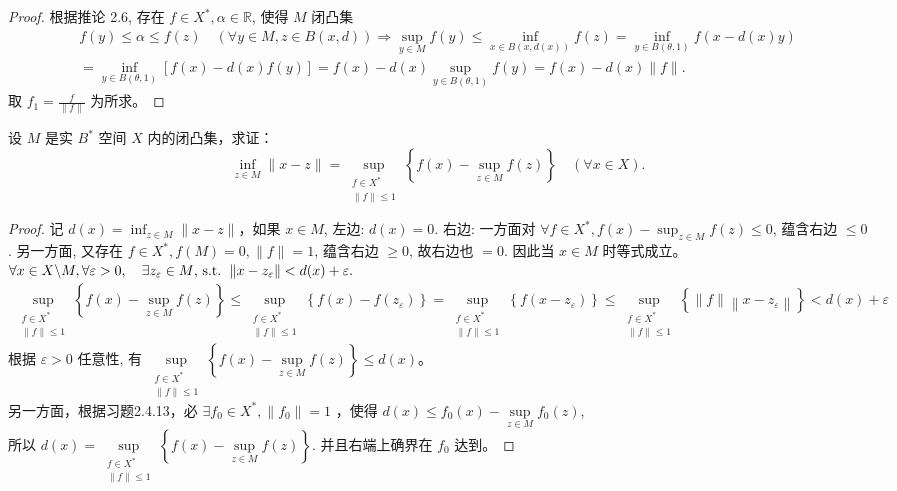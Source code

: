 \documentclass[lang=cn,newtx,10pt,scheme=chinese,thmcnt=chapter]{elegantbook}
\begin{document}
\begin{proof}
根据推论 2.6, 存在 $f \in {X} ^*, \alpha \in \mathbb{R} $, 使得 $M$ 闭凸集
\begin{equation*}
\begin{aligned}
 f(y) \leqslant \alpha \leqslant f(z) \quad(\forall y \in M, z \in B(x, d))
 \Rightarrow \sup _{y \in M} f(y) \leqslant \inf _{x \in B(x, d(x))} f(z)=\inf _{y \in B(\theta, 1)} f(x-d(x) y)  \\ =\inf_{y \in B(\theta, 1)}[f(x)-d(x) f(y)]=f(x)-d(x) \sup _{y \in B(\theta, 1)} f(y) = f(x)-d(x)\|f\| .
\end{aligned}
\end{equation*}
取 $f_1=\frac{f}{\| f\|}$ 为所求。
\end{proof}
\begin{problem}
设 $M$ 是实 $B^*$ 空间 ${X}$ 内的闭凸集，求证：
\[
\inf_{z \in M} \|x - z\| = \sup_{\substack{f \in {X}^* \\ \|f\| \leqslant 1}} \left\{ f(x) - \sup_{z \in M} f(z) \right\} \quad (\forall x \in {X}).
\]
\end{problem}
\begin{proof}
 记 $d(x)=\inf _{z \in M}\|x-z\|$，如果 $x \in M$, 左边: $d(x)=0$.
右边: 一方面对 $\forall f \in {X} ^*, f(x)-\sup _{z \in M} f(z) \leqslant 0$, 蕴含右边 $\leqslant 0$.
另一方面, 又存在 $f \in {X} ^*, f(M)=0,\|f\|=1$, 蕴含右边 $\geqslant 0$, 故右边也 $=0$.
因此当 $x \in M$ 时等式成立。\\
$ \forall x \in {X} \backslash M, \forall \varepsilon>0, \quad \exists z_{\varepsilon} \in M \text {, s.t. }\left\|x-z_{\varepsilon}\right\|<d(x)+\varepsilon . \\$
\begin{equation*}
\begin{aligned}
\sup _{\substack{f \in {X}^* \\ \|f\| \leqslant 1}}\left\{f(x)-\sup _{z \in M} f(z)\right\} \leqslant \sup _{\substack{f \in {X}^* \\ \|f\| \leqslant 1}}\left\{f(x)-f\left(z_{\varepsilon}\right)\right\} = \sup _{\substack{f \in {X}^* \\ \|f\| \leqslant 1}}\left\{f\left(x-z_{\varepsilon}\right)\right\} 
 \leqslant \sup _{\substack{f \in {X}^*\\  \|f\| \leqslant 1}}\left\{\|f\|\left\|x-z_{\varepsilon}\right\|\right\}<d(x)+\varepsilon 
\end{aligned}
\end{equation*}
根据 $\varepsilon>0$ 任意性, 有 $\sup \limits_{\substack{f \in {X}^* \\ \|f\| \leqslant 1}}\left\{f(x)-\sup\limits _{z \in M} f(z)\right\} \leqslant d(x)$。\\
另一方面，根据习题2.4.13，必 $\exists f_0 \in {X} ^*,\left\|f_0\right\|=1$ ，使得 $d(x) \leqslant f_0(x)-\sup \limits_{z \in M} f_0(z)$,\\
所以 $d(x)=\sup\limits _{\substack{f \in {X}^* \\ \|f\| \leqslant 1}}\left\{f(x)-\sup \limits_{z \in M} f(z)\right\}$. 并且右端上确界在 $f_0$ 达到。
\end{proof}
\end{document}

